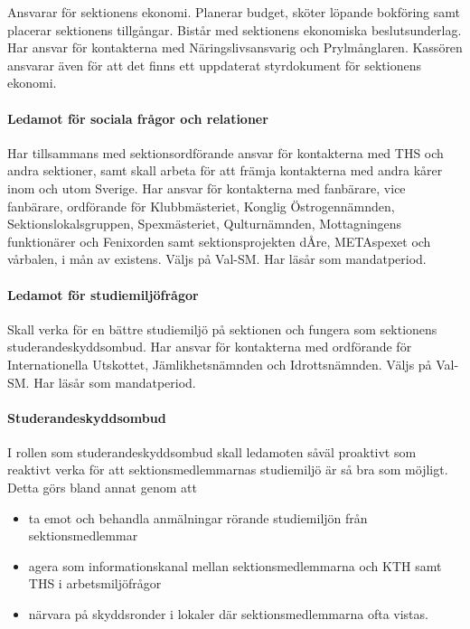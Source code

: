 \documentclass[a4paper,12pt]{article}
\begin{document}
Ansvarar för sektionens ekonomi. Planerar budget, sköter löpande bokföring samt placerar sektionens tillgångar. Bistår med sektionens ekonomiska beslutsunderlag. Har ansvar för kontakterna med Näringslivsansvarig och Prylmånglaren. Kassören ansvarar även för att det finns ett uppdaterat styrdokument för sektionens ekonomi.

\paragraph{Ledamot för sociala frågor och relationer}

Har tillsammans med sektionsordförande ansvar för kontakterna med THS och andra sektioner, samt skall arbeta för att främja kontakterna med andra kårer inom och utom Sverige. Har ansvar för kontakterna med fanbärare, vice fanbärare, ordförande för Klubbmästeriet, Konglig Östrogennämnden, Sektionslokalsgruppen, Spexmästeriet, Qulturnämnden, Mottagningens funktionärer och Fenixorden samt sektionsprojekten dÅre, METAspexet och vårbalen, i mån av existens. Väljs på Val-SM. Har läsår som mandatperiod.

\paragraph{Ledamot för studiemiljöfrågor}

Skall verka för en bättre studiemiljö på sektionen och fungera som sektionens
studerandeskyddsombud. Har ansvar för kontakterna med ordförande för Internationella Utskottet, Jämlikhetsnämnden och Idrottsnämnden. Väljs på Val-SM. Har läsår som mandatperiod.

\paragraph{Studerandeskyddsombud}

I rollen som studerandeskyddsombud skall ledamoten såväl proaktivt som reaktivt verka för att sektionsmedlemmarnas studiemiljö är så bra som möjligt. Detta görs bland annat genom att

\begin{itemize}
  \item ta emot och behandla anmälningar rörande studiemiljön från sektionsmedlemmar
  \item agera som informationskanal mellan sektionsmedlemmarna och KTH samt THS i arbetsmiljöfrågor
  \item närvara på skyddsronder i lokaler där sektionsmedlemmarna ofta vistas.
\end{itemize}
\end{document}
